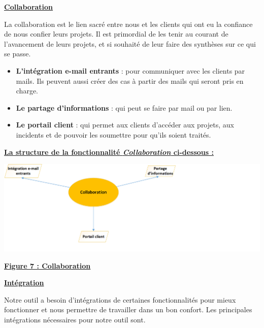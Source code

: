 \documentclass[11pt]{report}
\begin{document}
\begin{center}
\underline{\textbf{Collaboration}} 
\end{center}

\hspace{1cm} La collaboration est le lien sacré entre nous et les clients qui ont eu la confiance de nous confier leurs projets. Il est primordial de les tenir au courant de l’avancement de leurs projets, et si souhaité de leur faire des synthèses sur ce qui se passe. 

\begin{itemize}
	\item \textbf{L’intégration e-mail entrants} : pour communiquer avec les clients par mails. Ils peuvent aussi créer des cas à partir des mails qui seront pris en charge.
	
	\item \textbf{Le partage d’informations} : qui peut se faire par mail ou par lien.
	
	\item \textbf{Le portail client} : qui permet aux clients d’accéder aux projets, aux incidents et de pouvoir les soumettre pour qu’ils soient traités.
\end{itemize}

\begin{center}
\underline{\textbf{La structure de la fonctionnalité \textit{Collaboration} ci-dessous :}}
\end{center}
\quad

\begin{center}
\includegraphics[scale=0.8]{images/figure7.png} 
\quad

\underline{\textbf{Figure 7 : Collaboration}}
\end{center}

\newpage
\begin{center}
\underline{\textbf{Intégration}} 
\end{center}

\hspace{1cm} Notre outil a besoin d’intégrations de certaines fonctionnalités pour mieux fonctionner et nous permettre de travailler dans un bon confort. Les principales intégrations nécessaires pour notre outil sont.
\end{document}
